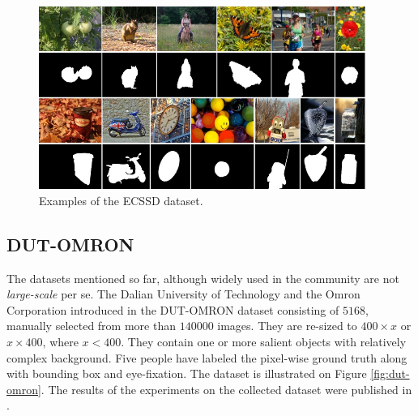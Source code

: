 \begin{figure}[h]
\begin{center}
\includegraphics[width=0.95\textwidth]{fig/ECSSD}
\end{center}
\caption{Examples of the ECSSD dataset.}
\label{fig:ecssd}
\end{figure}

\subsection{DUT-OMRON}
The datasets mentioned so far, although widely used in the community are not {\em large-scale} per se. The Dalian University of Technology and the Omron Corporation introduced in the DUT-OMRON dataset \cite{dut-omron_db} consisting of $5168$, manually selected from more than $140 000$ images. They are re-sized to $400 \times x$ or $x \times 400$, where  $x < 400$. They contain one or more salient objects with relatively complex background. Five people have labeled the pixel-wise ground truth along with bounding box and eye-fixation. The dataset is illustrated on Figure \ref{fig:dut-omron}. The results of the experiments on the collected dataset were published in \cite{yang2013saliency}.

